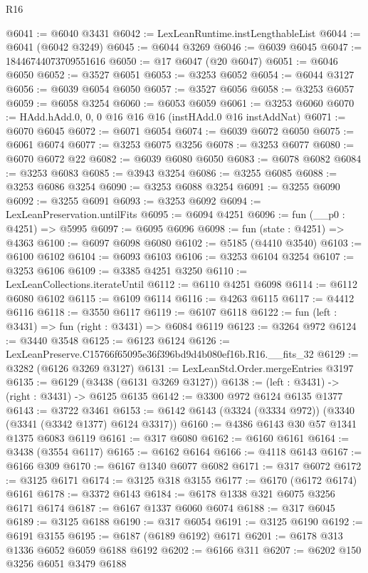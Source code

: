 \begin{lexlean}{R16}
\begin{coremodule}
@6041 := @6040 @3431
@6042 := LexLeanRuntime.instLengthableList
@6044 := @6041 (@6042 @3249)
@6045 := @6044 @3269
@6046 := @6039 @6045
@6047 := 18446744073709551616
@6050 := @17 @6047 (@20 @6047)
@6051 := @6046 @6050
@6052 := @3527 @6051
@6053 := @3253 @6052
@6054 := @6044 @3127
@6056 := @6039 @6054 @6050
@6057 := @3527 @6056
@6058 := @3253 @6057
@6059 := @6058 @3254
@6060 := @6053 @6059
@6061 := @3253 @6060
@6070 := HAdd.hAdd.{0, 0, 0} @16 @16 @16 (instHAdd.{0} @16 instAddNat)
@6071 := @6070 @6045
@6072 := @6071 @6054
@6074 := @6039 @6072 @6050
@6075 := @6061 @6074
@6077 := @3253 @6075 @3256
@6078 := @3253 @6077
@6080 := @6070 @6072 @22
@6082 := @6039 @6080 @6050
@6083 := @6078 @6082
@6084 := @3253 @6083
@6085 := @3943 @3254
@6086 := @3255 @6085
@6088 := @3253 @6086 @3254
@6090 := @3253 @6088 @3254
@6091 := @3255 @6090
@6092 := @3255 @6091
@6093 := @3253 @6092
@6094 := LexLeanPreservation.untilFits
@6095 := @6094 @4251
@6096 := fun (__p0 : @4251) => @5995
@6097 := @6095 @6096
@6098 := fun (state : @4251) => @4363
@6100 := @6097 @6098 @6080
@6102 := @5185 (@4410 @3540)
@6103 := @6100 @6102
@6104 := @6093 @6103
@6106 := @3253 @6104 @3254
@6107 := @3253 @6106
@6109 := @3385 @4251 @3250
@6110 := LexLeanCollections.iterateUntil
@6112 := @6110 @4251 @6098
@6114 := @6112 @6080 @6102
@6115 := @6109 @6114
@6116 := @4263 @6115
@6117 := @4412 @6116
@6118 := @3550 @6117
@6119 := @6107 @6118
@6122 := fun (left : @3431) => fun (right : @3431) => @6084 @6119
@6123 := @3264 @972
@6124 := @3440 @3548
@6125 := @6123 @6124
@6126 := LexLeanPreserve.C15766f65095e36f396bd9d4b080ef16b.R16.__fits_32
@6129 := @3282 (@6126 @3269 @3127)
@6131 := LexLeanStd.Order.mergeEntries @3197
@6135 := @6129 (@3438 (@6131 @3269 @3127))
@6138 := (left : @3431) -> (right : @3431) -> @6125 @6135
@6142 := @3300 @972 @6124 @6135 @1377
@6143 := @3722 @3461
@6153 := @6142 @6143 (@3324 (@3334 @972)) (@3340 (@3341 (@3342 @1377) @6124 @3317))
@6160 := @4386 @6143 @30 @57 @1341 @1375 @6083 @6119
@6161 := @317 @6080
@6162 := @6160 @6161
@6164 := @3438 (@3554 @6117)
@6165 := @6162 @6164
@6166 := @4118 @6143
@6167 := @6166 @309
@6170 := @6167 @1340 @6077 @6082
@6171 := @317 @6072
@6172 := @3125 @6171
@6174 := @3125 @318 @3155
@6177 := @6170 (@6172 @6174) @6161
@6178 := @3372 @6143
@6184 := @6178 @1338 @321 @6075 @3256 @6171 @6174
@6187 := @6167 @1337 @6060 @6074
@6188 := @317 @6045
@6189 := @3125 @6188
@6190 := @317 @6054
@6191 := @3125 @6190
@6192 := @6191 @3155
@6195 := @6187 (@6189 @6192) @6171
@6201 := @6178 @313 @1336 @6052 @6059 @6188 @6192
@6202 := @6166 @311
@6207 := @6202 @150 @3256 @6051 @3479 @6188

\end{coremodule}
\end{lexlean}
